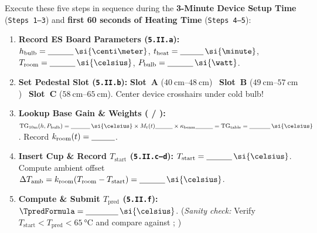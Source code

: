 \begin{devicebox}
Execute these five steps in sequence during the \textbf{3-Minute Device Setup Time} (\texttt{Steps 1–3}) and \textbf{first 60 seconds of Heating Time} (\texttt{Steps 4–5}):
\begin{enumerate}
  \item \textbf{Record ES Board Parameters (\texttt{5.II.a}):} $h_{\mathrm{bulb}} = \underline{\hspace{1.1cm}}\,\si{\centi\meter}$, \quad $t_{\mathrm{heat}} = \underline{\hspace{1.0cm}}\,\si{\minute}$, \quad $T_{\mathrm{room}} = \underline{\hspace{1.1cm}}\,\si{\celsius}$, \quad $P_{\mathrm{bulb}} = \underline{\hspace{1.1cm}}\,\si{\watt}$.
  \item \textbf{Set Pedestal Slot (\texttt{5.II.b}):} \textbf{Slot~A} ($\SIrange{40}{48}{\centi\meter}$) \textbar\ \textbf{Slot~B} ($\SIrange{49}{57}{\centi\meter}$) \textbar\ \textbf{Slot~C} ($\SIrange{58}{65}{\centi\meter}$). Center device crosshairs under cold bulb!
  \item \textbf{Lookup Base Gain \& Weights ( / ):} $\mathrm{TG}_{10\mathrm{m}}(h, P_{\mathrm{bulb}}) = \underline{\hspace{1.1cm}}\,\si{\celsius} \times M_t(t) \underline{\hspace{1.0cm}} \times \kappa_{\mathrm{beam}} \underline{\hspace{1.0cm}} = \mathbf{\mathrm{TG}_{\mathrm{table}}} = \underline{\hspace{1.2cm}}\,\si{\celsius}$. Record $k_{\mathrm{room}}(t) = \underline{\hspace{1.0cm}}$.
  \item \textbf{Insert Cup \& Record $T_{\mathrm{start}}$ (\texttt{5.II.c--d}):} $T_{\mathrm{start}} = \underline{\hspace{1.1cm}}\,\si{\celsius}$. Compute ambient offset $\Delta T_{\mathrm{amb}} = k_{\mathrm{room}}(T_{\mathrm{room}} - T_{\mathrm{start}}) = \underline{\hspace{1.1cm}}\,\si{\celsius}$.
  \item \textbf{Compute \& Submit $T_{\mathrm{pred}}$ (\texttt{5.II.f}):} $\TpredFormula = \mathbf{\underline{\hspace{1.4cm}}\,\si{\celsius}}$. (\textit{Sanity check:} Verify $T_{\mathrm{start}} < T_{\mathrm{pred}} < \SI{65}{\celsius}$ and compare against ; \HandInRule)
\end{enumerate}
\end{devicebox}

